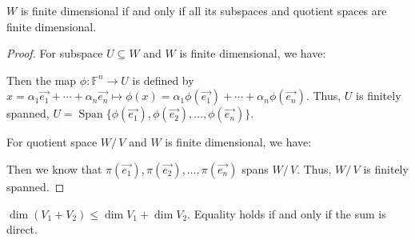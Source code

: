 \documentclass[
	11pt, %
	fleqn, %
	a4paper, %
]{LegrandOrangeBook}
\newcommand{\quotient}[2]{#1 /\, #2} %
\newcommand{\F}{\mathbb{F}} %
\DeclareMathOperator{\Span}{Span}
\begin{document}
\begin{proposition} \label{prop:finite_dimensional_subspace_quotient_space}
    $W$ is finite dimensional if and only if all its subspaces and quotient spaces are finite dimensional.
\end{proposition}

\begin{proof}
    For subspace $U \subseteq W$ and $W$ is finite dimensional, we have:
    \begin{center}
    \end{center}
    Then the map $\phi : \F^n \to U$ is defined by $x = \alpha_1 \vec{e_1} + \cdots + \alpha_n \vec{e_n} \mapsto \phi(x) = \alpha_1 \phi(\vec{e_1}) + \cdots + \alpha_n \phi(\vec{e_n})$. Thus, $U$ is finitely spanned, $U = \Span\{\phi(\vec{e_1}), \phi(\vec{e_2}), \ldots, \phi(\vec{e_n})\}$. 

    For quotient space $\quotient{W}{V}$ and $W$ is finite dimensional, we have:
    \begin{center}
    \end{center}
    Then we know that $\pi(\vec{e_1}), \pi(\vec{e_2}), \ldots, \pi(\vec{e_n})$ spans $\quotient{W}{V}$. Thus, $\quotient{W}{V}$ is finitely spanned.
\end{proof}

\begin{proposition} \label{prop:dimension_of_sum_of_subspaces}
    $\dim{(V_1 + V_2)} \leq \dim{V_1} + \dim{V_2}$. Equality holds if and only if the sum is direct.
\end{proposition}
\end{document}
